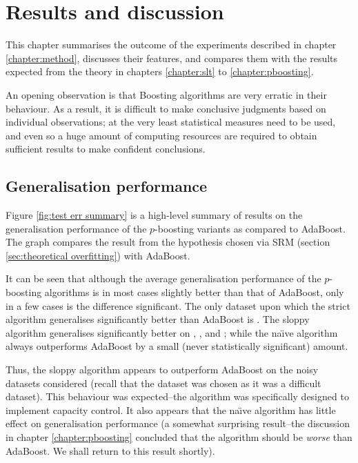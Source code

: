 
\chapter{Results and discussion}
\label{chapter:results}

This chapter summarises the outcome of the experiments described in
chapter \ref{chapter:method}, discusses their features, and compares
them with the results expected from the theory in chapters
\ref{chapter:slt} to \ref{chapter:pboosting}.

An opening observation is that Boosting algorithms are very erratic in
their behaviour.  As a result, it is difficult to make conclusive
judgments based on individual observations; at the very least
statistical measures need to be used, and even so a huge amount of
computing resources are required to obtain sufficient results to make
confident conclusions.

\section{Generalisation performance}

Figure \ref{fig:test err summary} is a high-level summary of results
on the generalisation performance of the $p$-boosting variants as
compared to AdaBoost.  The graph compares the result from the
hypothesis chosen via SRM (section \ref{sec:theoretical overfitting})
with AdaBoost. 

It can be seen that although the average generalisation performance of
the $p$-boosting algorithms is in most cases slightly better than that
of AdaBoost, only in a few cases is the difference significant.  The
only dataset upon which the strict algorithm generalises significantly
better than AdaBoost is .  The sloppy algorithm generalises
significantly better on , ,  and
; while the na\"{\i}ve algorithm always outperforms
AdaBoost by a small (never statistically significant) amount.

Thus, the sloppy algorithm appears to outperform AdaBoost on the noisy
datasets considered (recall that the  dataset was chosen as
it was a difficult dataset).  This behaviour was expected--the
algorithm was specifically designed to implement capacity control.  It
also appears that the na\"{\i}ve algorithm has little effect on
generalisation performance (a somewhat surprising result--the
discussion in chapter \ref{chapter:pboosting} concluded that the
algorithm should be \emph{worse} than AdaBoost.  We shall return to
this result shortly).


